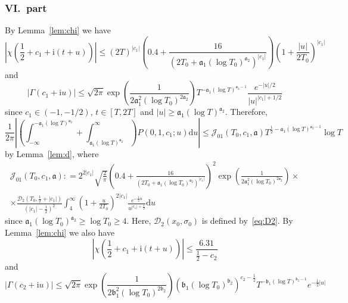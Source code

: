 \documentclass[a4paper,reqno]{amsart}
\theoremstyle{definition}
\newcommand{\de}[0]{\mathrel{\mathop:}=}
\newcommand{\ie}[0]{\mathrm{i}}
\newcommand{\dif}[1]{\mathrm{d}#1}
\begin{document}
\subsubsection{VI.~part}
\label{sec:VIpart}

By Lemma~\ref{lem:chi} we have
\[
\left|\chi\left(\frac{1}{2}+c_1+\ie (t+u)\right)\right| \leq (2T)^{|c_1|}\left(0.4+\frac{16}{\left(2T_0+\mathfrak{a}_1\left(\log{T_0}\right)^{\mathfrak{a}_2}\right)^{|c_1|}}\right)\left(1+\frac{|u|}{2T_0}\right)^{|c_1|}
\]
and
\[
\left|\Gamma(c_1+\ie u)\right| \leq \sqrt{2\pi}\exp{\left(\frac{1}{2\mathfrak{a}_1^2\left(\log{T_0}\right)^{2\mathfrak{a}_2}}\right)}T^{-\mathfrak{a}_1\left(\log{T}\right)^{\mathfrak{a}_{2}-1}}\frac{e^{-|u|/2}}{|u|^{|c_1|+1/2}}
\]
since $c_1\in(-1,-1/2)$, $t\in[T,2T]$ and $|u|\geq\mathfrak{a}_1(\log{T})^{\mathfrak{a}_2}$. Therefore,
\begin{equation}
\label{eq:cJ01Est}
\frac{1}{2\pi}\left|\left(\int_{-\infty}^{-\mathfrak{a}_1\left(\log{T}\right)^{\mathfrak{a}_2}}+\int_{\mathfrak{a}_1\left(\log{T}\right)^{\mathfrak{a}_2}}^{\infty}\right)P(0,1,c_1;u)\dif{u}\right| \leq \mathcal{J}_{01}\left(T_0,c_1,\bm{\mathfrak{a}}\right)T^{\frac{1}{2}-\mathfrak{a}_1\left(\log{T}\right)^{\mathfrak{a}_{2}-1}}\log{T}
\end{equation}
by Lemma~\ref{lem:d}, where
\begin{multline}
\label{eq:cJ01}
\mathcal{J}_{01}\left(T_0,c_1,\bm{\mathfrak{a}}\right) \de 2^{2|c_1|}\sqrt{\frac{2}{\pi}}\left(0.4+\frac{16}{\left(2T_0+\mathfrak{a}_1\left(\log{T_0}\right)^{\mathfrak{a}_2}\right)^{|c_1|}}\right)^{2}\exp{\left(\frac{1}{2\mathfrak{a}_1^2\left(\log{T_0}\right)^{2\mathfrak{a}_2}}\right)} \times \\
\times \frac{\mathcal{D}_{2}\left(T_0,\frac{1}{2}+|c_1|\right)}{\left(|c_1|-\frac{1}{2}\right)^{2}} \int_{4}^{\infty}\left(1+\frac{u}{2T_0}\right)^{2|c_1|}\frac{e^{-\frac{1}{2}u}}{u^{|c_1|+\frac{1}{2}}}\dif{u}
\end{multline}
since $\mathfrak{a}_1\left(\log{T_0}\right)^{\mathfrak{a}_{2}}\geq\log{T_0}\geq 4$. Here, $\mathcal{D}_{2}(x_0,\sigma_0)$ is defined by~\eqref{eq:D2}. By Lemma~\ref{lem:chi} we also have
\[
\left|\chi\left(\frac{1}{2}+c_1+\ie (t+u)\right)\right| \leq \frac{6.31}{\frac{1}{2}-c_2}
\]
and
\[
\left|\Gamma(c_2+\ie u)\right| \leq \sqrt{2\pi}\exp{\left(\frac{1}{2\mathfrak{b}_1^2\left(\log{T_0}\right)^{2\mathfrak{b}_2}}\right)}\left(\mathfrak{b}_1\left(\log{T_0}\right)^{\mathfrak{b}_{2}}\right)^{c_2-\frac{1}{2}}T^{-\mathfrak{b}_1\left(\log{T}\right)^{\mathfrak{b}_{2}-1}}e^{-\frac{1}{2}|u|}
\]
\end{document}
